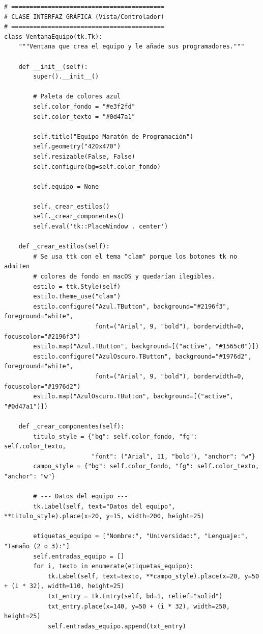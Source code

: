 \documentclass[11pt, a4paper]{article}
\begin{document}
\begin{lstlisting}
# ==========================================
# CLASE INTERFAZ GRÁFICA (Vista/Controlador)
# ==========================================
class VentanaEquipo(tk.Tk):
    """Ventana que crea el equipo y le añade sus programadores."""

    def __init__(self):
        super().__init__()

        # Paleta de colores azul
        self.color_fondo = "#e3f2fd"
        self.color_texto = "#0d47a1"

        self.title("Equipo Maratón de Programación")
        self.geometry("420x470")
        self.resizable(False, False)
        self.configure(bg=self.color_fondo)

        self.equipo = None

        self._crear_estilos()
        self._crear_componentes()
        self.eval('tk::PlaceWindow . center')

    def _crear_estilos(self):
        # Se usa ttk con el tema "clam" porque los botones tk no admiten
        # colores de fondo en macOS y quedarían ilegibles.
        estilo = ttk.Style(self)
        estilo.theme_use("clam")
        estilo.configure("Azul.TButton", background="#2196f3", foreground="white",
                         font=("Arial", 9, "bold"), borderwidth=0, focuscolor="#2196f3")
        estilo.map("Azul.TButton", background=[("active", "#1565c0")])
        estilo.configure("AzulOscuro.TButton", background="#1976d2", foreground="white",
                         font=("Arial", 9, "bold"), borderwidth=0, focuscolor="#1976d2")
        estilo.map("AzulOscuro.TButton", background=[("active", "#0d47a1")])

    def _crear_componentes(self):
        titulo_style = {"bg": self.color_fondo, "fg": self.color_texto,
                        "font": ("Arial", 11, "bold"), "anchor": "w"}
        campo_style = {"bg": self.color_fondo, "fg": self.color_texto, "anchor": "w"}

        # --- Datos del equipo ---
        tk.Label(self, text="Datos del equipo", **titulo_style).place(x=20, y=15, width=200, height=25)

        etiquetas_equipo = ["Nombre:", "Universidad:", "Lenguaje:", "Tamaño (2 o 3):"]
        self.entradas_equipo = []
        for i, texto in enumerate(etiquetas_equipo):
            tk.Label(self, text=texto, **campo_style).place(x=20, y=50 + (i * 32), width=110, height=25)
            txt_entry = tk.Entry(self, bd=1, relief="solid")
            txt_entry.place(x=140, y=50 + (i * 32), width=250, height=25)
            self.entradas_equipo.append(txt_entry)


\end{lstlisting}
\end{document}
